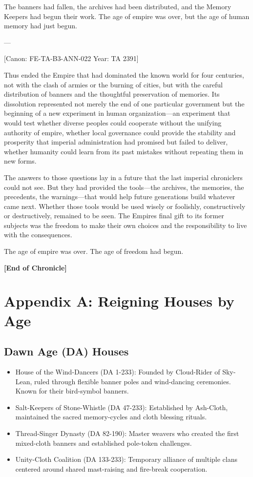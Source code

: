 The banners had fallen, the archives had been distributed, and the
Memory Keepers had begun their work. The age of empire was over, but the
age of human memory had just begun.

---

{[}Canon: FE-TA-B3-ANN-022 \textbar{} Year: TA 2391{]}

Thus ended the Empire that had dominated the known world for four
centuries, not with the clash of armies or the burning of cities, but
with the careful distribution of banners and the thoughtful preservation
of memories. Its dissolution represented not merely the end of one
particular government but the beginning of a new experiment in human
organization---an experiment that would test whether diverse peoples
could cooperate without the unifying authority of empire, whether local
governance could provide the stability and prosperity that imperial
administration had promised but failed to deliver, whether humanity
could learn from its past mistakes without repeating them in new forms.

The answers to those questions lay in a future that the last imperial
chroniclers could not see. But they had provided the tools---the
archives, the memories, the precedents, the warnings---that would help
future generations build whatever came next. Whether those tools would
be used wisely or foolishly, constructively or destructively, remained
to be seen. The Empire\textquotesingle s final gift to its former
subjects was the freedom to make their own choices and the
responsibility to live with the consequences.

The age of empire was over. The age of freedom had begun.

\textbf{{[}End of Chronicle{]}}

\section{Appendix A: Reigning Houses by
Age}\label{appendix-a-reigning-houses-by-age}

\subsection{Dawn Age (DA) Houses}\label{dawn-age-da-houses}

\begin{itemize}
\tightlist
\item
  House of the Wind-Dancers (DA 1-233): Founded by Cloud-Rider of
  Sky-Lean, ruled through flexible banner poles and wind-dancing
  ceremonies. Known for their bird-symbol banners.
\item
  Salt-Keepers of Stone-Whistle (DA 47-233): Established by Ash-Cloth,
  maintained the sacred memory-cycles and cloth blessing rituals.
\item
  Thread-Singer Dynasty (DA 82-190): Master weavers who created the
  first mixed-cloth banners and established pole-token challenges.
\item
  Unity-Cloth Coalition (DA 133-233): Temporary alliance of multiple
  clans centered around shared mast-raising and fire-break cooperation.
\end{itemize}

